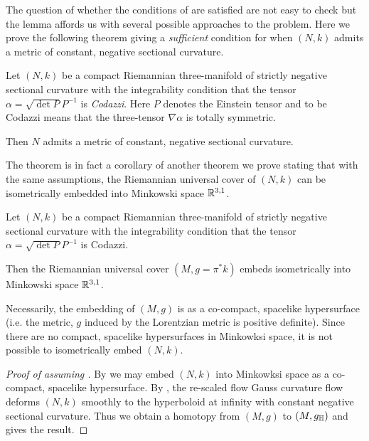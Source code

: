 \documentclass[a4paper, 12pt]{amsart}
\begin{document}
The question of whether the conditions of  are satisfied are not easy to check but the lemma affords us with several possible approaches to the problem. Here we prove the following theorem giving a \emph{sufficient} condition for when \((N, k)\) admits a metric of constant, negative sectional curvature.

\begin{thm}
\label{thm:intg_const_curv}
Let \((N, k)\) be a compact Riemannian three-manifold of strictly negative sectional curvature with the integrability condition that the tensor \(\alpha = \sqrt{\det P} P^{-1}\) is \emph{Codazzi}. Here \(P\) denotes the Einstein tensor and to be Codazzi means that the three-tensor \(\nabla \alpha\) is totally symmetric.

Then \(N\) admits a metric of constant, negative sectional curvature.
\end{thm}

The theorem is in fact a corollary of another theorem we prove stating that with the same assumptions, the Riemannian universal cover of \((N, k)\) can be isometrically embedded into Minkowski space \(\mathbb{R}^{3,1}\).

\begin{thm}
\label{thm:intg_embed}
Let \((N, k)\) be a compact Riemannian three-manifold of strictly negative sectional curvature with the integrability condition that the tensor \(\alpha = \sqrt{\det P} P^{-1}\) is Codazzi.

Then the Riemannian universal cover \((M, g = \pi^{\ast} k)\) embeds isometrically into Minkowski space \(\mathbb{R}^{3,1}\).
\end{thm}

\begin{rem}
Necessarily, the embedding of \((M, g)\) is as a co-compact, spacelike hypersurface (i.e. the metric, \(g\) induced by the Lorentzian metric is positive definite). Since there are no compact, spacelike hypersurfaces in Minkowksi space, it is not possible to isometrically embed \((N, k)\).
\end{rem}

\begin{proof}
[Proof of  assuming ]

By  we may embed \((N, k)\) into Minkowksi space as a co-compact, spacelike hypersurface. By \cite[Theorem 1.1]{MR3344442}, the re-scaled flow Gauss curvature flow deforms \((N, k)\) smoothly to the hyperboloid at infinity with constant negative sectional curvature. Thus we obtain a homotopy from \((M, g)\) to \((M, g_{\mathbb{H}})\) and  gives the result.
\end{proof}
\end{document}
